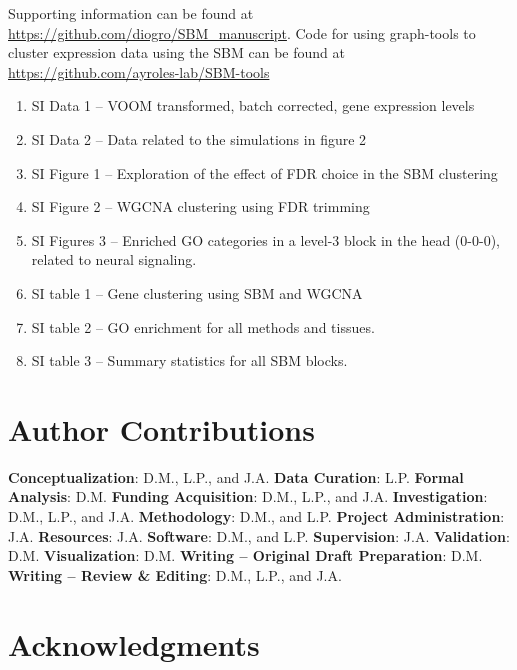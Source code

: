 \documentclass[
]{article}
\begin{document}
Supporting information can be found at
\url{https://github.com/diogro/SBM_manuscript}. Code for using
graph-tools to cluster expression data using the SBM can be found at
\url{https://github.com/ayroles-lab/SBM-tools}

\begin{enumerate}
\def\labelenumi{\arabic{enumi}.}
\item
  SI Data 1 -- VOOM transformed, batch corrected, gene expression levels
\item
  SI Data 2 -- Data related to the simulations in figure 2
\item
  SI Figure 1 -- Exploration of the effect of FDR choice in the SBM
  clustering
\item
  SI Figure 2 -- WGCNA clustering using FDR trimming
\item
  SI Figures 3 -- Enriched GO categories in a level-3 block in the head
  (0-0-0), related to neural signaling.
\item
  SI table 1 -- Gene clustering using SBM and WGCNA
\item
  SI table 2 -- GO enrichment for all methods and tissues.
\item
  SI table 3 -- Summary statistics for all SBM blocks.
\end{enumerate}

\section{Author Contributions}\label{author-contributions}

\textbf{Conceptualization}: D.M., L.P., and J.A. \textbf{Data Curation}:
L.P. \textbf{Formal Analysis}: D.M. \textbf{Funding Acquisition}: D.M.,
L.P., and J.A. \textbf{Investigation}: D.M., L.P., and J.A.
\textbf{Methodology}: D.M., and L.P. \textbf{Project Administration}:
J.A. \textbf{Resources}: J.A. \textbf{Software}: D.M., and L.P.
\textbf{Supervision}: J.A. \textbf{Validation}: D.M.
\textbf{Visualization}: D.M. \textbf{Writing -- Original Draft
Preparation}: D.M. \textbf{Writing -- Review \& Editing}: D.M., L.P.,
and J.A.

\section{Acknowledgments}\label{acknowledgments}
\end{document}
